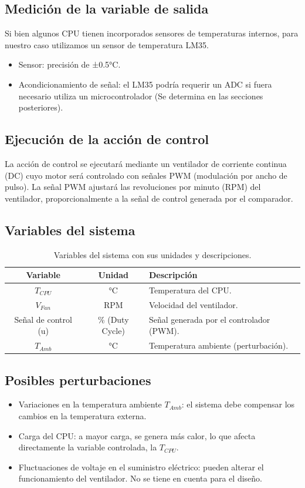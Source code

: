 \documentclass[12pt]{article}
\begin{document}
	\subsection{Medición de la variable de salida}
	Si bien algunos CPU tienen incorporados sensores de temperaturas internos, para nuestro caso utilizamos un sensor de temperatura LM35.
	
	\begin{itemize}
		\item Sensor: precisión de ±0.5°C.
		\item Acondicionamiento de señal: el LM35 podría requerir un ADC si fuera necesario utiliza un microcontrolador (Se determina en las secciones posteriores).
	\end{itemize}

	\subsection{Ejecución de la acción de control}
	La acción de control se ejecutará mediante un ventilador de corriente continua (DC) cuyo motor será controlado con señales PWM (modulación por ancho de pulso). La señal PWM ajustará las revoluciones por minuto (RPM) del ventilador, proporcionalmente a la señal de control generada por el comparador.

	\subsection{Variables del sistema}
	\begin{table}[h!]
		\centering
		\begin{tabular}{|c|c|l|}
			\hline
			\textbf{Variable} & \textbf{Unidad} & \textbf{Descripción} \\ \hline
			$T_{CPU}$ & °C & Temperatura del CPU. \\ \hline
			$V_{Fan}$ & RPM & Velocidad del ventilador. \\ \hline
			Señal de control (u) & \% (Duty Cycle) & Señal generada por el controlador (PWM). \\ \hline
			$T_{Amb}$ & °C & Temperatura ambiente (perturbación). \\ \hline
		\end{tabular}
		\caption{Variables del sistema con sus unidades y descripciones.}
		\label{tab:variables}
	\end{table}
	
	
	\subsection{Posibles perturbaciones}
	\begin{itemize}
		\item Variaciones en la temperatura ambiente $T_{Amb}$: el sistema debe compensar los cambios en la temperatura externa.
		\item Carga del CPU: a mayor carga, se genera más calor, lo que afecta directamente la variable controlada, la $T_{CPU}$.
		\item Fluctuaciones de voltaje en el suministro eléctrico: pueden alterar el funcionamiento del ventilador. No se tiene en cuenta para el diseño.
	\end{itemize}
	
\end{document}
